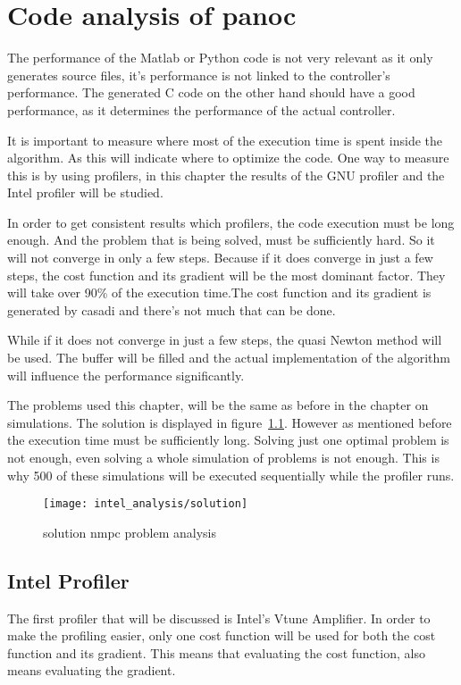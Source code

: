\chapter{Code analysis of panoc}
The performance of the Matlab or Python code is not very relevant as it only generates source files, it's performance is not linked to the controller's performance. The generated C code on the other hand should have a good performance, as it determines the performance of the actual controller.

It is important to measure where most of the execution time is spent inside the algorithm. As this will indicate where to optimize the code. One way to measure this is by using profilers, in this chapter the results of the GNU profiler and the Intel profiler will be studied.

In order to get consistent results which profilers, the code execution must be long enough. And the problem that is being solved, must be sufficiently hard. So it will not converge in only a few steps. Because if it does converge in just a few steps, the cost function and its gradient will be the most dominant factor. They will take over 90\% of the execution time.The cost function and its gradient is generated by casadi and there's not much that can be done.

While if it does not converge in just a few steps, the quasi Newton method will be used. The buffer will be filled and the actual implementation of the algorithm will influence the performance significantly.

The problems used this chapter, will be the same as before in the chapter on simulations. The solution is displayed in figure~\ref{fig:solution nmpc problem analysis}. However as mentioned before the execution time must be sufficiently long. Solving just one optimal problem is not enough, even solving a whole simulation of problems is not enough. This is why 500 of these simulations will be executed sequentially while the profiler runs.

\begin{figure}[H]
	\centering
	\texttt{[image: intel\_analysis/solution]}
	\caption{solution nmpc problem analysis}
	\label{fig:solution nmpc problem analysis}
\end{figure}

\section{Intel Profiler}
The first profiler that will be discussed is Intel's Vtune Amplifier. In order to make the profiling easier, only one cost function will be used for both the cost function and its gradient. This means that evaluating the cost function, also means evaluating the gradient.


